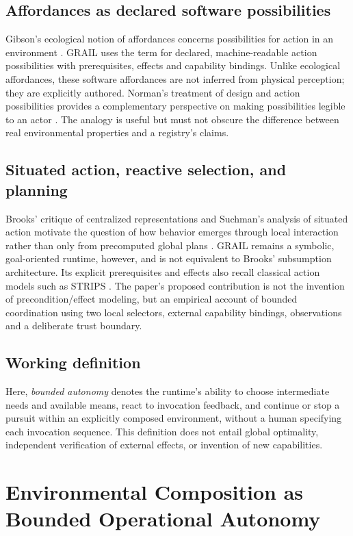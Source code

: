 \documentclass[11pt]{article}
\begin{document}
\subsection{Affordances as declared software possibilities}
Gibson's ecological notion of affordances concerns possibilities for action in an environment \cite{Gibson1979}. GRAIL uses the term for declared, machine-readable action possibilities with prerequisites, effects and capability bindings. Unlike ecological affordances, these software affordances are not inferred from physical perception; they are explicitly authored. Norman's treatment of design and action possibilities provides a complementary perspective on making possibilities legible to an actor \cite{Norman1988}. The analogy is useful but must not obscure the difference between real environmental properties and a registry's claims.
\subsection{Situated action, reactive selection, and planning}
Brooks' critique of centralized representations and Suchman's analysis of situated action motivate the question of how behavior emerges through local interaction rather than only from precomputed global plans \cite{Brooks1991,Suchman1987}. GRAIL remains a symbolic, goal-oriented runtime, however, and is not equivalent to Brooks' subsumption architecture. Its explicit prerequisites and effects also recall classical action models such as STRIPS \cite{FikesNilsson1971}. The paper's proposed contribution is not the invention of precondition/effect modeling, but an empirical account of bounded coordination using two local selectors, external capability bindings, observations and a deliberate trust boundary.
\subsection{Working definition}
Here, \emph{bounded autonomy} denotes the runtime's ability to choose intermediate needs and available means, react to invocation feedback, and continue or stop a pursuit within an explicitly composed environment, without a human specifying each invocation sequence. This definition does not entail global optimality, independent verification of external effects, or invention of new capabilities.
\section{Environmental Composition as Bounded Operational Autonomy}
\end{document}
